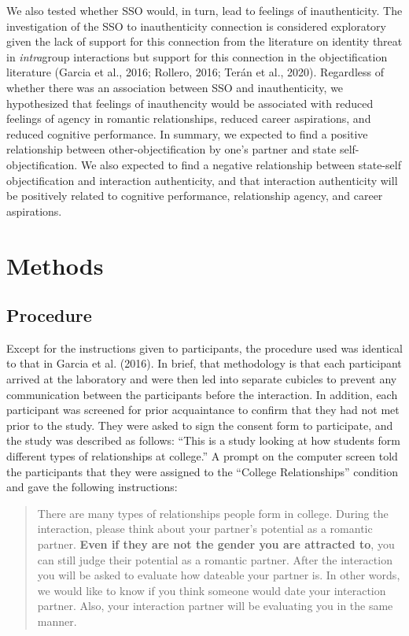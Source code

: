 \documentclass[man]{apa6}
\begin{document}
We also tested whether SSO would, in turn, lead to feelings of
inauthenticity. The investigation of the SSO to inauthenticity
connection is considered exploratory given the lack of support for this
connection from the literature on identity threat in \emph{intra}group
interactions but support for this connection in the objectification
literature (Garcia et al., 2016; Rollero, 2016; Terán et al., 2020).
Regardless of whether there was an association between SSO and
inauthenticity, we hypothesized that feelings of inauthencity would be
associated with reduced feelings of agency in romantic relationships,
reduced career aspirations, and reduced cognitive performance. In
summary, we expected to find a positive relationship between
other-objectification by one's partner and state self-objectification.
We also expected to find a negative relationship between state-self
objectification and interaction authenticity, and that interaction
authenticity will be positively related to cognitive performance,
relationship agency, and career aspirations.

\section{Methods}\label{methods}

\subsection{Procedure}\label{procedure}

Except for the instructions given to participants, the procedure used
was identical to that in Garcia et al. (2016). In brief, that
methodology is that each participant arrived at the laboratory and were
then led into separate cubicles to prevent any communication between the
participants before the interaction. In addition, each participant was
screened for prior acquaintance to confirm that they had not met prior
to the study. They were asked to sign the consent form to participate,
and the study was described as follows: \enquote{This is a study looking
at how students form different types of relationships at college.} A
prompt on the computer screen told the participants that they were
assigned to the \enquote{College Relationships} condition and gave the
following instructions:

\begin{quote}
There are many types of relationships people form in college. During the
interaction, please think about your partner's potential as a romantic
partner. \textbf{Even if they are not the gender you are attracted to},
you can still judge their potential as a romantic partner. After the
interaction you will be asked to evaluate how dateable your partner is.
In other words, we would like to know if you think someone would date
your interaction partner. Also, your interaction partner will be
evaluating you in the same manner.
\end{quote}
\end{document}
